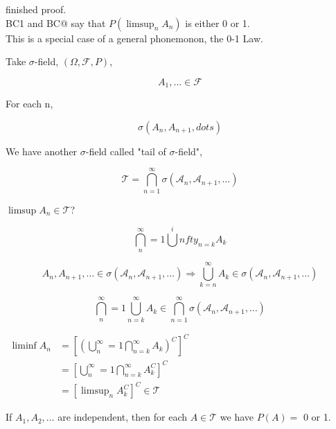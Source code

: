 \documentclass[11pt,fleqn]{book} %
\begin{document}
finished proof. \\

BC1 and BC@ say that  $P \left(\limsup_n A_n \right)$ is either 0 or 1.\\

This is a special case of a general phonemonon, the 0-1 Law.

Take $\sigma$-field, $(\Omega, \mathcal{F}, P)$, 

$$A_1, \dots \in \mathcal{F} $$

For each n, 

$$\sigma(A_n, A_{n+1}, dots) $$

We have another $\sigma$-field called "tail of $\sigma$-field",

$$\mathcal{T} =  \bigcap ^\infty_{n=1} \sigma(\mathcal{A}_n, \mathcal{A}_{n+1}, \dots) $$

\begin{example}[4.18 in Billingsly]
	$\limsup A_n \in \mathcal{T}$?

		$$\bigcap ^\infty_n=1 \bigcup^infty_{n=k}  A_k  $$

		$$ A_n, A_{n+1}, \dots \in \sigma(\mathcal{A}_n, \mathcal{A}_{n+1}, \dots) \Rightarrow \bigcup^\infty_{k=n} A_k \in \sigma(\mathcal{A}_n, \mathcal{A}_{n+1}, \dots)$$

		$$\bigcap ^\infty_n=1 \bigcup^\infty_{n=k}  A_k \in \bigcap ^\infty_{n=1} \sigma(\mathcal{A}_n, \mathcal{A}_{n+1}, \dots) $$

	$\begin{aligned}
		\liminf A_n &= \left[ (\bigcup^\infty_n=1 \bigcap ^\infty_{n=k}  A_k )^C \right]^C\\
			&= \left[ \bigcup^\infty_n=1 \bigcap ^\infty_{n=k}  A_k^C \right]^C\\
			&= \left[\limsup_n A_k^C \right]^C \in \mathcal{T}
	\end{aligned}
	$


\end{example}



\begin{theorem}
	If $A_1, A_2, \dots$ are independent, then for each $A \in \mathcal{T}$ we have $P(A) = $ 0 or 1.
\end{theorem}
\end{document}
